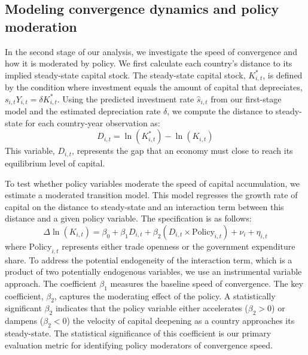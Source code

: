 \documentclass[]{article}
\begin{document}
\subsection{Modeling convergence dynamics and policy moderation}
In the second stage of our analysis, we investigate the speed of convergence and how it is moderated by policy. We first calculate each country's distance to its implied steady-state capital stock. The steady-state capital stock, $K^*_{i,t}$, is defined by the condition where investment equals the amount of capital that depreciates, $s_{i,t}Y_{i,t} = \delta K^*_{i,t}$. Using the predicted investment rate $\hat{s}_{i,t}$ from our first-stage model and the estimated depreciation rate $\delta$, we compute the distance to steady-state for each country-year observation as:
\begin{equation}
D_{i,t} = \ln(K^*_{i,t}) - \ln(K_{i,t})
\end{equation}
This variable, $D_{i,t}$, represents the gap that an economy must close to reach its equilibrium level of capital.

To test whether policy variables moderate the speed of capital accumulation, we estimate a moderated transition model. This model regresses the growth rate of capital on the distance to steady-state and an interaction term between this distance and a given policy variable. The specification is as follows:
\begin{equation}
\Delta \ln(K_{i,t}) = \beta_0 + \beta_1 D_{i,t} + \beta_2 (D_{i,t} \times \text{Policy}_{i,t}) + \nu_i + \eta_{i,t}
\end{equation}
where $\text{Policy}_{i,t}$ represents either trade openness or the government expenditure share. To address the potential endogeneity of the interaction term, which is a product of two potentially endogenous variables, we use an instrumental variable approach. The coefficient $\beta_1$ measures the baseline speed of convergence. The key coefficient, $\beta_2$, captures the moderating effect of the policy. A statistically significant $\beta_2$ indicates that the policy variable either accelerates ($\beta_2 > 0$) or dampens ($\beta_2 < 0$) the velocity of capital deepening as a country approaches its steady-state. The statistical significance of this coefficient is our primary evaluation metric for identifying policy moderators of convergence speed.
\end{document}
